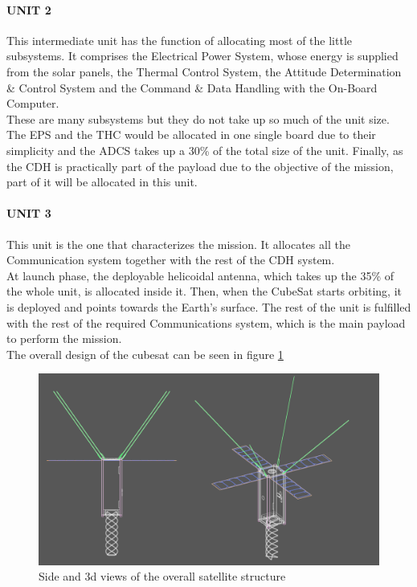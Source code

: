 \paragraph{UNIT 2}
This intermediate unit has the function of allocating most of the little subsystems.
It comprises the Electrical Power System, whose energy is supplied from the solar
panels, the Thermal Control System, the Attitude Determination \& Control System
and the Command \& Data Handling with the On-Board Computer.\\
These are many subsystems but they do not take up so much of the unit size. The
EPS and the THC would be allocated in one single board due to their simplicity
and the ADCS takes up a 30\% of the total size of the unit. Finally, as the
CDH is practically part of the payload due to the objective of the mission,
part of it will be allocated in this unit.\\

\paragraph{UNIT 3}
This unit is the one that characterizes the mission. It allocates all the
Communication system together with the rest of the CDH system.\\
At launch phase, the deployable helicoidal antenna, which takes up the
35\% of the whole unit, is allocated inside it. Then, when the CubeSat starts
orbiting, it is deployed and points towards the Earth’s surface. The rest of the
unit is fulfilled with the rest of the required Communications system, which is
the main payload to perform the mission.\\

The overall design of the cubesat can be seen in figure \ref{fig:cubesat_structure}

\begin{figure}[h!]
	\centering
	\includegraphics[width=\textwidth]{img/Blueprint_grey.png}
	\caption[Overall satellite structure]{Side and 3d views of the overall satellite structure}
	\label{fig:cubesat_structure}
\end{figure}
